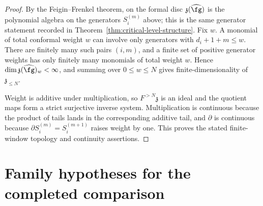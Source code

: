 \begin{proof}
By the Feigin--Frenkel theorem, on the formal disc
\(\mathfrak z(\widehat{\fg})\) is the polynomial algebra on the
generators \(S_i^{(m)}\) above; this is the same generator statement
recorded in Theorem~\ref{thm:critical-level-structure}. Fix \(w\). A
monomial of total conformal weight \(w\) can involve only generators with
\(d_i+1+m\leq w\). There are finitely many such pairs \((i,m)\), and a
finite set of positive generator weights has only finitely many
monomials of total weight \(w\). Hence
\(\dim \mathfrak z(\widehat{\fg})_w<\infty\), and summing over
\(0\leq w\leq N\) gives finite-dimensionality of
\(\mathfrak z_{\leq N}\).

Weight is additive under multiplication, so \(F^{>N}\mathfrak z\) is an
ideal and the quotient maps form a strict surjective inverse system.
Multiplication is continuous because the product of tails lands in the
corresponding additive tail, and \(\partial\) is continuous because
\(\partial S_i^{(m)}=S_i^{(m+1)}\) raises weight by one.  This proves
the stated finite-window topology and continuity assertions.
\end{proof}

\section{Family hypotheses for the completed comparison}
\label{sec:family-by-family-applicability}

